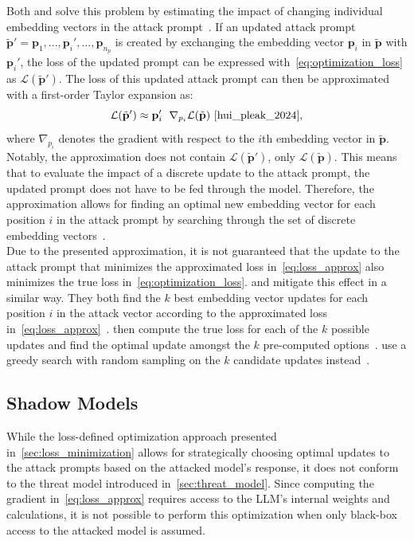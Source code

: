 Both \hui and \shi solve this problem by estimating the impact of changing individual embedding vectors in the attack prompt~\cite{hui_pleak_2024, shi_optimization-based_2024}.
If an updated attack prompt $\tilde{\textbf{p}}' = \textbf{p}_1, ..., \textbf{p}_i', ..., \textbf{p}_{n_p}$ is created by exchanging the embedding vector $\textbf{p}_i$ in $\tilde{\textbf{p}}$ with $\textbf{p}_i'$, the loss of the updated prompt can be expressed with~\cref{eq:optimization_loss} as $\mathcal{L}(\tilde{\textbf{p}}')$.
The loss of this updated attack prompt can then be approximated with a first-order Taylor expansion as:
\begin{equation}
    \mathcal{L}(\tilde{\textbf{p}}') \approx \textbf{p}_i' \;\ \nabla_{p_i} \mathcal{L}(\tilde{\textbf{p}})~\cite{hui_pleak_2024},
    \label{eq:loss_approx}
\end{equation}
where $\nabla_{p_i}$ denotes the gradient with respect to the $i$th embedding vector in $\tilde{\textbf{p}}$.
Notably, the approximation does not contain $\mathcal{L}(\tilde{\textbf{p}}')$, only $\mathcal{L}(\tilde{\textbf{p}})$.
This means that to evaluate the impact of a discrete update to the attack prompt, the updated prompt does not have to be fed through the model.
Therefore, the approximation allows for finding an optimal new embedding vector for each position $i$ in the attack prompt by searching through the set of discrete embedding vectors~\cite{hui_pleak_2024, shi_optimization-based_2024}.\\

Due to the presented approximation, it is not guaranteed that the update to the attack prompt that minimizes the approximated loss in~\cref{eq:loss_approx} also minimizes the true loss in~\cref{eq:optimization_loss}.
\hui and \shi mitigate this effect in a similar way.
They both find the $k$ best embedding vector updates for each position $i$ in the attack vector according to the approximated loss in~\cref{eq:loss_approx}~\cite{hui_pleak_2024, shi_optimization-based_2024}.
\hui then compute the true loss for each of the $k$ possible updates and find the optimal update amongst the $k$ pre-computed options~\cite{hui_pleak_2024}.
\shi use a greedy search with random sampling on the $k$ candidate updates instead~\cite{shi_optimization-based_2024}.

\subsection{Shadow Models}
While the loss-defined optimization approach presented in~\cref{sec:loss_minimization} allows for strategically choosing optimal updates to the attack prompts based on the attacked model's response, it does not conform to the threat model introduced in~\cref{sec:threat_model}.
Since computing the gradient in~\cref{eq:loss_approx} requires access to the LLM's internal weights and calculations, it is not possible to perform this optimization when only black-box access to the attacked model is assumed.\\

